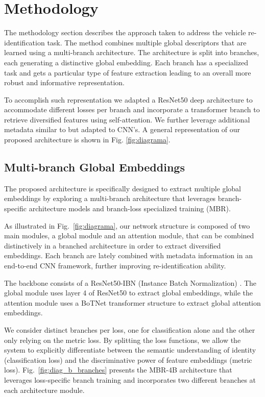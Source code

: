 \documentclass[letterpaper, 10pt, conference]{ieeeconf}
\begin{document}
\section{Methodology} The methodology section describes the approach taken to address the vehicle re-identification task. The method combines multiple global descriptors that are learned using a multi-branch architecture. The architecture is split into  branches, each generating a distinctive global embedding. Each branch has a specialized task and gets a particular type of feature extraction leading to an overall more robust and informative representation.

To accomplish such representation we adapted a ResNet50 deep architecture to accommodate different losses per branch and incorporate a transformer branch \cite{srinivas2021bottleneck} to retrieve diversified features using self-attention. We further leverage additional metadata similar to \cite{he2021transreid} but adapted to CNN's. A general representation of our proposed architecture is shown in Fig. \ref{fig:diagrama}.



\subsection{Multi-branch Global Embeddings}



The proposed architecture is specifically designed to extract multiple global embeddings by exploring a multi-branch architecture that leverages branch-specific architecture models and branch-loss specialized training (MBR). 


As illustrated in Fig.~\ref{fig:diagrama}, our network structure is composed of two main modules, a global module and an attention module, that can be combined distinctively in a branched architecture in order to extract diversified embeddings. Each branch are lately combined with metadata information in an end-to-end CNN framework, further improving re-identification ability.


The backbone consists of a ResNet50-IBN (Instance Batch Normalization) \cite{pan2018two}.
The global module uses layer 4 of ResNet50 to extract global embeddings, while the attention module uses a BoTNet transformer structure to extract global attention embeddings.


We consider distinct branches per loss, one for classification alone and the other only relying on the metric loss. 
By splitting the loss functions, we allow the system to explicitly differentiate between the semantic understanding of identity (classification loss) and the discriminative power of feature embeddings (metric loss).
Fig.~\ref{fig:diag_b_branches} presents the MBR-4B architecture that leverages loss-specific branch training and incorporates two different branches at each architecture module. 
\end{document}
